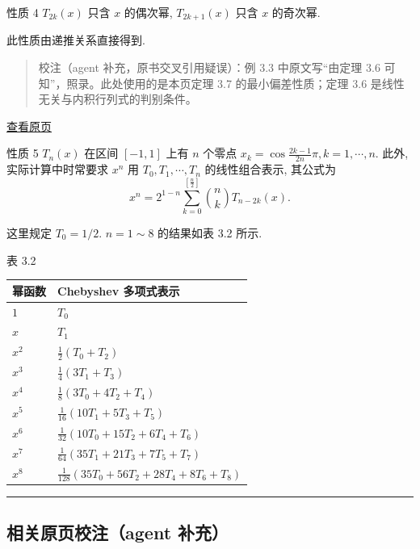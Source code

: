 \documentclass[
  10pt,
  fontset=fandol]{ctexart}
\newcounter{none} %
\begin{document}
性质 4 \(T_{2k}(x)\) 只含 \(x\) 的偶次幂, \(T_{2k+1}(x)\) 只含 \(x\) 的奇次幂.

此性质由递推关系直接得到.

\begin{quote}
校注（agent 补充，原书交叉引用疑误）：例 3.3 中原文写``由定理 3.6 可知''，照录。此处使用的是本页定理 3.7 的最小偏差性质；定理 3.6 是线性无关与内积行列式的判别条件。
\end{quote}

\href{../../source-images/pdf-075.jpeg}{查看原页}

性质 5 \(T_n(x)\) 在区间 \([-1,1]\) 上有 \(n\) 个零点 \(x_k = \cos \frac{2k-1}{2n}\pi, k=1, \cdots, n\). 此外, 实际计算中时常要求 \(x^n\) 用 \(T_0, T_1, \cdots, T_n\) 的线性组合表示, 其公式为 \[
x^n = 2^{1-n} \sum_{k=0}^{[\frac{n}{2}]} \binom{n}{k} T_{n-2k}(x). \tag{3.4.9}
\]

这里规定 \(T_0 = 1/2\). \(n=1 \sim 8\) 的结果如表 3.2 所示.

表 3.2

{\def\LTcaptype{none} %
\begin{longtable}[]{@{}ll@{}}
\toprule\noalign{}
幂函数 & Chebyshev 多项式表示 \\
\midrule\noalign{}
\endhead
\bottomrule\noalign{}
\endlastfoot
\(1\) & \(T_0\) \\
\(x\) & \(T_1\) \\
\(x^2\) & \(\frac12(T_0+T_2)\) \\
\(x^3\) & \(\frac14(3T_1+T_3)\) \\
\(x^4\) & \(\frac18(3T_0+4T_2+T_4)\) \\
\(x^5\) & \(\frac1{16}(10T_1+5T_3+T_5)\) \\
\(x^6\) & \(\frac1{32}(10T_0+15T_2+6T_4+T_6)\) \\
\(x^7\) & \(\frac1{64}(35T_1+21T_3+7T_5+T_7)\) \\
\(x^8\) & \(\frac1{128}(35T_0+56T_2+28T_4+8T_6+T_8)\) \\
\end{longtable}
}

\begin{center}\rule{0.5\linewidth}{0.5pt}\end{center}

\subsection{相关原页校注（agent 补充）}\label{ux76f8ux5173ux539fux9875ux6821ux6ce8agent-ux8865ux5145}
\end{document}

